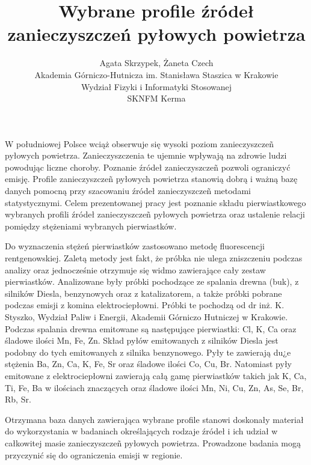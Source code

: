 \documentclass[12pt, a4paper]{article}
\begin{document}
\title{Wybrane profile źródeł zanieczyszczeń pyłowych powietrza}
\author{Agata Skrzypek, Żaneta Czech \\Akademia Górniczo-Hutnicza im. Stanisława Staszica w Krakowie\\Wydział Fizyki i Informatyki Stosowanej\\ SKNFM Kerma}
\date {}
\maketitle
\thispagestyle{title}
W południowej Polsce wciąż obserwuje się wysoki poziom zanieczyszczeñ pyłowych powietrza. Zanieczyszczenia te ujemnie wpływają na zdrowie ludzi powodując liczne choroby. Poznanie źródeł zanieczyszczeñ pozwoli ograniczyć emisję. Profile zanieczyszczeñ pyłowych powietrza stanowią dobrą i ważną bazę danych pomocną przy szacowaniu źródeł zanieczyszczeñ metodami statystycznymi.
Celem prezentowanej pracy jest poznanie składu pierwiastkowego wybranych profili źródeł zanieczyszczeñ pyłowych powietrza oraz ustalenie relacji pomiędzy stężeniami wybranych pierwiastków.

     	Do wyznaczenia stężeń pierwiastków zastosowano metodę fluorescencji rentgenowskiej. Zaletą metody jest fakt, że próbka nie ulega zniszczeniu podczas analizy oraz jednocześnie otrzymuje się widmo zawierające cały zestaw pierwiastków. Analizowane były próbki pochodzące ze spalania drewna (buk), z silników Diesla, benzynowych oraz z katalizatorem, a także próbki pobrane podczas emisji z komina elektrociepłowni. Próbki te pochodzą od dr inż. K. Styszko, Wydział Paliw i Energii, Akademii Górniczo Hutniczej w Krakowie. Podczas spalania drewna emitowane są następujące pierwiastki: Cl, K, Ca oraz śladowe ilości Mn, Fe, Zn. Skład pyłów emitowanych z silników Diesla jest podobny do tych emitowanych z silnika benzynowego. Pyły te zawierają du¿e stężenia Ba, Zn, Ca, K, Fe, Sr oraz śladowe ilości Co, Cu, Br. Natomiast pyły emitowane z elektrociepłowni zawierają całą gamę pierwiastków takich jak K, Ca, Ti, Fe, Ba w ilościach znaczących oraz śladowe ilości Mn, Ni, Cu, Zn, As, Se, Br, Rb, Sr.

     	Otrzymana baza danych zawierająca wybrane profile stanowi doskonały materiał do wykorzystania w badaniach określających rodzaje źródeł i ich udział w całkowitej masie zanieczyszczeñ pyłowych powietrza. Prowadzone badania mogą przyczynić się do ograniczenia emisji w regionie.
\end{document}
